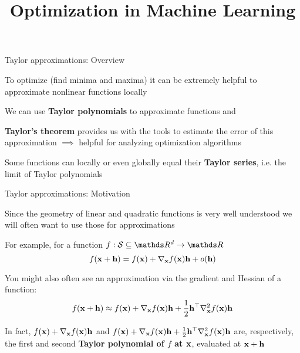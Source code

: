 \documentclass[11pt,compress,t,notes=noshow, xcolor=table]{beamer}
\title{Optimization in Machine Learning}
\begin{document}

\begin{framei}{Taylor approximations: Overview}
\item To optimize (find minima and maxima) it can be extremely helpful to approximate nonlinear functions locally 
\item We can use \textbf{Taylor polynomials} to approximate functions and
\item \textbf{Taylor's theorem} provides us with the tools to estimate the error of this approximation $\implies$ helpful for analyzing optimization algorithms
\item Some functions can locally or even globally equal their \textbf{Taylor series}, i.e. the limit of Taylor polynomials

{}

\end{framei}


\begin{framei}{Taylor approximations: Motivation}

\item Since the geometry of linear and quadratic functions is very well understood we will often want to use those for approximations
\item For example, for a function $f: \mathcal{S}\subseteq \R^d \to \R$
$$
f(\mathbf{x}+\mathbf{h})=f(\mathbf{x})+\nabla_{\mathbf{x}}f(\mathbf{x}) \mathbf{h}+o(\mathbf{h})
$$
\item You might also often see an approximation via the gradient and Hessian of a function:
$$
f(\mathbf{x}+\mathbf{h})\approx f(\mathbf{x})+\nabla_{\mathbf{x}}f(\mathbf{x}) \mathbf{h}+\frac{1}{2}\mathbf{h}^\top \nabla^2_{\mathbf{x}}f(\mathbf{x}) \mathbf{h}
$$
\item In fact, $f(\mathbf{x})+\nabla_{\mathbf{x}}f(\mathbf{x}) \mathbf{h}$ and $f(\mathbf{x})+\nabla_{\mathbf{x}}f(\mathbf{x}) \mathbf{h}+\frac{1}{2}\mathbf{h}^\top \nabla^2_{\mathbf{x}}f(\mathbf{x})\mathbf{h}$ are, respectively, the first and second \textbf{Taylor polynomial of $f$ at $\mathbf{x}$}, evaluated at $\mathbf{x}+\mathbf{h}$
    
\end{framei}
\end{document}
